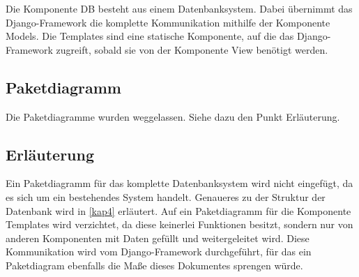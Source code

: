 Die Komponente DB besteht aus einem Datenbanksystem. 
Dabei übernimmt das Django-Framework die komplette Kommunikation mithilfe 
der Komponente Models. 
Die Templates sind eine statische Komponente, auf die das Django-Framework
zugreift, sobald sie von der Komponente View benötigt werden. 

\subsection{Paketdiagramm}
Die Paketdiagramme wurden weggelassen. Siehe dazu den Punkt Erläuterung.

\subsection{Erl\"auterung}
Ein Paketdiagramm für das komplette Datenbanksystem wird nicht eingefügt, da es
sich um ein bestehendes System handelt. Genaueres zu der Struktur der
Datenbank wird in \ref{kap4} erläutert.
Auf ein Paketdiagramm für die Komponente Templates wird verzichtet, da diese
keinerlei Funktionen besitzt, sondern nur von anderen Komponenten mit Daten
gefüllt und weitergeleitet wird. Diese Kommunikation wird vom Django-Framework
durchgeführt, für das ein Paketdiagram ebenfalls die Maße dieses Dokumentes
sprengen würde.
